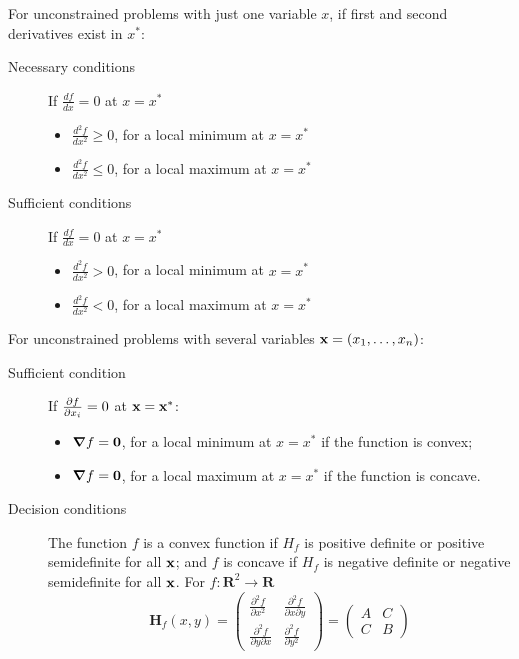   For unconstrained problems with just one variable $x$, if first and second derivatives exist in $x^*$:
  \begin{description}
    \item[Necessary conditions] If $\frac{df}{dx}=0$ at $x=x^*$
    \begin{itemize}
      \item $\frac{d^2f}{dx^2}\geq 0$, for a local minimum at $x=x^*$
      \item $\frac{d^2f}{dx^2}\leq 0$, for a local maximum at $x=x^*$
    \end{itemize}
    \item[Sufficient conditions] If $\frac{df}{dx}=0$ at $x=x^*$
    \begin{itemize}
      \item $\frac{d^2f}{dx^2}> 0$, for a local minimum at $x=x^*$
      \item $\frac{d^2f}{dx^2}< 0$, for a local maximum at $x=x^*$
    \end{itemize}
  \end{description}
  For unconstrained problems with several variables $\textbf{x}=(x_1,\ldots,x_n)$:
  \begin{description}
    \item[Sufficient condition] If $\pdv{f}{x_i}=0$ at $\textbf{x}=\textbf{x}^*$:
    \begin{itemize}
      \item $\grad{f}=\textbf{0}$, for a local minimum at $x=x^*$ if the function is convex;
      \item $\grad{f}=\textbf{0}$, for a local maximum at $x=x^*$ if the function is concave.
    \end{itemize}
    \item[Decision conditions] The function $f$ is a convex function if $H_f$ is positive definite or positive semidefinite for all $\textbf{x}$; and $f$ is concave if $H_f$ is negative definite or negative semidefinite for all $\textbf{x}$. For $f:\mathbf{R}^2\rightarrow\mathbf{R}$
    \[
      {\mathbf H}_f(x,y)=\begin{pmatrix} \frac{\partial^2 f}{\partial x^2} & \frac{\partial^2 f}{\partial x \partial y} \\ \frac{\partial^2 f}{\partial y \partial x} & \frac{\partial^2 f}{\partial y^2}\end{pmatrix} =
      \begin{pmatrix} A & C \\ C & B \end{pmatrix}
\]
  \end{description}

